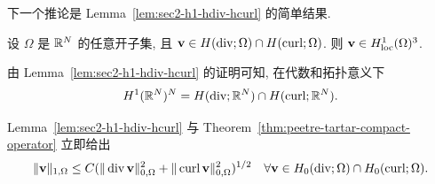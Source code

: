 下一个推论是 Lemma~\ref{lem:sec2-h1-hdiv-hcurl} 的简单结果.

\setcounter{statement}{9}
\begin{Corollary}\label{cor:sec2-local-h1-hdiv-hcurl}
设 $\Omega$ 是 $\mathbb{R}^N$ 的任意开子集, 且
$\mathbf v\in H(\operatorname{div};\Omega)\cap H(\operatorname{curl};\Omega)$. 则
$\mathbf v\in H_{\mathrm{loc}}^1(\Omega)^3$.
\end{Corollary}

\setcounter{statement}{5}
\begin{Remark}\label{rem:sec2-global-h1-hdiv-hcurl}
由 Lemma~\ref{lem:sec2-h1-hdiv-hcurl} 的证明可知, 在代数和拓扑意义下
\[
  H^1(\mathbb{R}^N)^N=H(\operatorname{div};\mathbb{R}^N)\cap H(\operatorname{curl};\mathbb{R}^N).
\]
\end{Remark}

\setcounter{statement}{6}
\begin{Remark}\label{rem:sec2-hdiv-hcurl-estimate}
Lemma~\ref{lem:sec2-h1-hdiv-hcurl} 与
Theorem~\ref{thm:peetre-tartar-compact-operator} 立即给出
\[
  \|\mathbf v\|_{1,\Omega}
  \le C(\|\operatorname{div}\mathbf v\|_{0,\Omega}^2+
  \|\operatorname{curl}\mathbf v\|_{0,\Omega}^2)^{1/2}
  \quad\forall\mathbf v\in H_0(\operatorname{div};\Omega)\cap H_0(\operatorname{curl};\Omega).
\]
\end{Remark}
